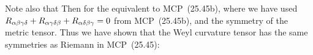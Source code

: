 {	Note also that
	Then for the equivalent to MCP~(25.45b),
	where we have used $R_{\alpha \beta \gamma \delta} + R_{\alpha \gamma \delta \beta} + R_{\alpha \delta \beta \gamma} = 0$ from MCP~(25.45b), and the symmetry of the metric tensor.  Thus we have shown that the Weyl curvature tensor has the same symmetries as Riemann in MCP~(25.45): \vfix
}
